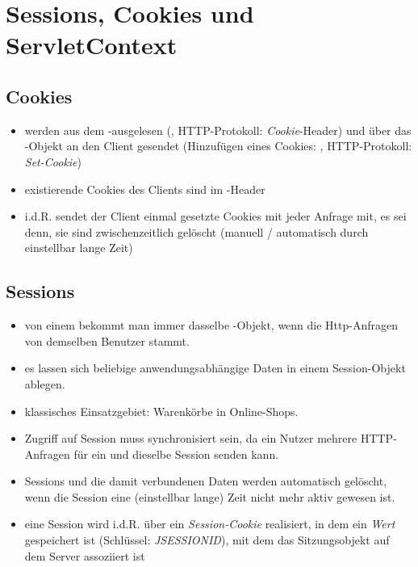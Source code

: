 \section{Sessions, Cookies und ServletContext}

\subsection{Cookies}

\begin{itemize}
    \item werden aus dem -ausgelesen (, HTTP-Protokoll: \textit{Cookie}-Header) und über das -Objekt an den Client gesendet (Hinzufügen eines Cookies: , HTTP-Protokoll: \textit{Set-Cookie})
    \item existierende Cookies des Clients sind im -Header
    \item i.d.R. sendet der Client einmal gesetzte Cookies mit jeder Anfrage mit, es sei denn, sie sind zwischenzeitlich gelöscht (manuell / automatisch durch einstellbar lange Zeit)
\end{itemize}


\subsection{Sessions}
\begin{itemize}
    \item von einem  bekommt man immer dasselbe -Objekt, wenn die Http-Anfragen von demselben Benutzer stammt.
    \item es lassen sich beliebige anwendungsabhängige Daten in einem Session-Objekt ablegen.
    \item klassisches Einsatzgebiet: Warenkörbe in Online-Shops.
    \item Zugriff auf Session muss synchronisiert sein, da ein Nutzer mehrere HTTP-Anfragen für ein und dieselbe Session senden kann.
    \item Sessions und die damit verbundenen Daten werden automatisch gelöscht, wenn die Session eine (einstellbar lange) Zeit nicht mehr aktiv gewesen ist.
    \item eine Session wird i.d.R. über ein \textit{Session-Cookie} realisiert, in dem ein \textit{Wert} gespeichert ist (Schlüssel: \textit{JSESSIONID}), mit dem das Sitzungsobjekt auf dem Server assoziiert ist
\end{itemize}


